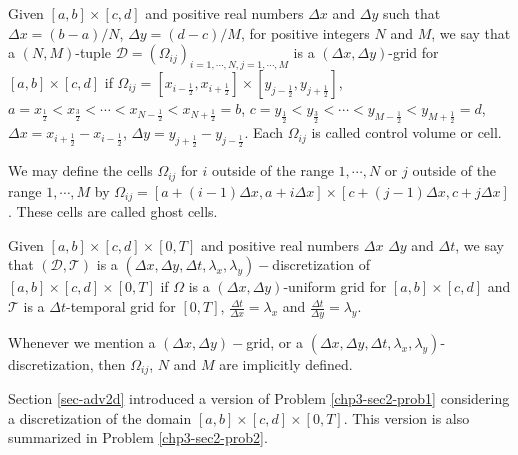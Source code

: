 \begin{definition}
	\label{chp2-def-2dgrid}
	Given $[a,b]\times [c,d]$ and positive real numbers $\Delta x$ and $\Delta y$ such that $\Delta x = (b-a)/N$, 
	$\Delta y = (d-c)/M$, for positive integers $N$ and $M$,
	we say that a $(N,M)$-tuple $\mathcal{D}=(\Omega_{ij})_{i=1,\cdots,N,j=1,\cdots,M}$ is a $(\Delta x, \Delta y)$-grid for $[a,b]\times [c,d]$ if
	$\Omega_{ij} = [x_{i-\frac{1}{2}}, x_{i+\frac{1}{2}}]\times [y_{j-\frac{1}{2}}, y_{j+\frac{1}{2}}]$, 
	$a = x_{\frac{1}{2}} < x_{\frac{3}{2}} < \cdots < x_{N-\frac{1}{2}} < x_{N+\frac{1}{2}} = b$,
	$c = y_{\frac{1}{2}} < y_{\frac{3}{2}} < \cdots < y_{M-\frac{1}{2}} < y_{M+\frac{1}{2}} = d$,
	$\Delta x = x_{i+\frac{1}{2}}-x_{i-\frac{1}{2}}$, 	$\Delta y = y_{j+\frac{1}{2}}-y_{j-\frac{1}{2}}$.
	Each $\Omega_{ij}$ is called control volume or cell.
\end{definition}
\begin{remark}
	We may define the cells $\Omega_{ij}$ for $i$ outside of the range $1,\cdots, N$ or $j$ outside of the range $1,\cdots, M$  by 
	$\Omega_{ij} = [a+(i-1)\Delta x,a+i\Delta x]\times [c+(j-1)\Delta x,c+j\Delta x]$.  These cells are called ghost cells.
\end{remark}
\begin{definition}
	\label{chp2-def-dxdytimegrid}
	Given $[a,b]\times[c,d]\times [0,T]$ and positive real numbers $\Delta x$ $\Delta y$ and $\Delta t$, we say that $(\mathcal{D},\mathcal{T})$ is a
	$(\Delta x,\Delta y,\Delta t, \lambda_x, \lambda_y)-$discretization of $[a,b]\times[c,d]\times [0,T]$ if $\Omega$ is a $(\Delta x,\Delta y)$-uniform 
	grid for $[a,b]\times[c,d]$ and $\mathcal{T}$ is a $\Delta t$-temporal grid for $[0,T]$, $\frac{\Delta t}{\Delta x} = \lambda_x$
	and  $\frac{\Delta t}{\Delta y} = \lambda_y$.
\end{definition}
\begin{remark}
	Whenever we mention a $(\Delta x,\Delta y)-$grid, or a $(\Delta x,\Delta y,\Delta t, \lambda_x, \lambda_y)$-discretization,
	then $\Omega_{ij}$, $N$ and $M$ are implicitly defined.
\end{remark}
Section \ref{sec-adv2d} introduced a version of Problem \ref{chp3-sec2-prob1}
considering a discretization of the domain $[a,b] \times [c,d] \times[0,T]$. 
This version is also summarized in Problem \ref{chp3-sec2-prob2}.	
